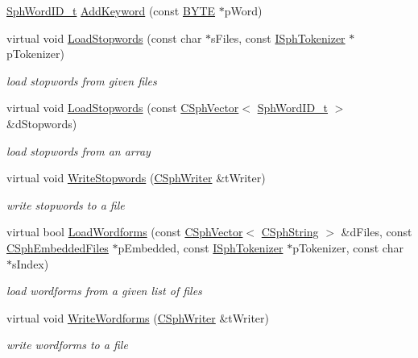 \begin{DoxyCompactItemize}
\hyperlink{sphinx_8h_a80a94d5984fdf9214a98f3e5e65df963}{Sph\-Word\-I\-D\-\_\-t} \hyperlink{classCRtDictKeywords_a6c03fde7585324658a177f0455c916d0}{Add\-Keyword} (const \hyperlink{sphinxstd_8h_a4ae1dab0fb4b072a66584546209e7d58}{B\-Y\-T\-E} $\ast$p\-Word)
\item 
virtual void \hyperlink{classCRtDictKeywords_aacfcbc008883a5da51f66625a1032e9d}{Load\-Stopwords} (const char $\ast$s\-Files, const \hyperlink{classISphTokenizer}{I\-Sph\-Tokenizer} $\ast$p\-Tokenizer)
\begin{DoxyCompactList}\small\item\em load stopwords from given files \end{DoxyCompactList}\item 
virtual void \hyperlink{classCRtDictKeywords_af0e6ceb78599615ef70417207020b965}{Load\-Stopwords} (const \hyperlink{classCSphVector}{C\-Sph\-Vector}$<$ \hyperlink{sphinx_8h_a80a94d5984fdf9214a98f3e5e65df963}{Sph\-Word\-I\-D\-\_\-t} $>$ \&d\-Stopwords)
\begin{DoxyCompactList}\small\item\em load stopwords from an array \end{DoxyCompactList}\item 
virtual void \hyperlink{classCRtDictKeywords_adea77ce5ebeceffc282435144521207d}{Write\-Stopwords} (\hyperlink{classCSphWriter}{C\-Sph\-Writer} \&t\-Writer)
\begin{DoxyCompactList}\small\item\em write stopwords to a file \end{DoxyCompactList}\item 
virtual bool \hyperlink{classCRtDictKeywords_a033d6c12dc1517eaa6854a634c85d774}{Load\-Wordforms} (const \hyperlink{classCSphVector}{C\-Sph\-Vector}$<$ \hyperlink{structCSphString}{C\-Sph\-String} $>$ \&d\-Files, const \hyperlink{structCSphEmbeddedFiles}{C\-Sph\-Embedded\-Files} $\ast$p\-Embedded, const \hyperlink{classISphTokenizer}{I\-Sph\-Tokenizer} $\ast$p\-Tokenizer, const char $\ast$s\-Index)
\begin{DoxyCompactList}\small\item\em load wordforms from a given list of files \end{DoxyCompactList}\item 
virtual void \hyperlink{classCRtDictKeywords_ace440f33f756909d9161c4eb1a005b0e}{Write\-Wordforms} (\hyperlink{classCSphWriter}{C\-Sph\-Writer} \&t\-Writer)
\begin{DoxyCompactList}\small\item\em write wordforms to a file \end{DoxyCompactList}\item 

\end{DoxyCompactItemize}
